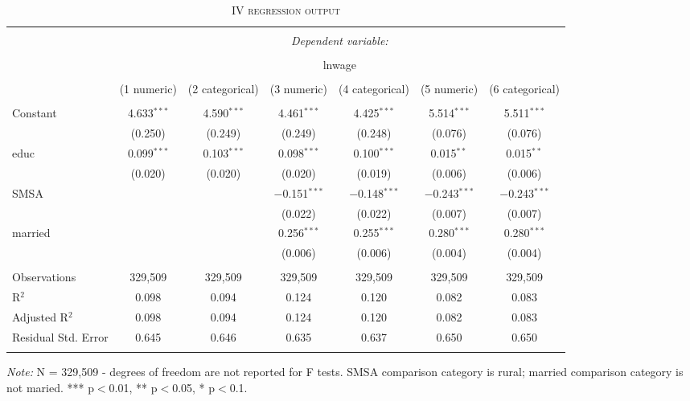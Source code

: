 \documentclass[a4paper]{article}
\begin{document}
\begin{table}[!htbp] \centering 
\begin{adjustwidth}{0.cm}{-0cm}
\begin{threeparttable}
\small
\captionsetup{font=small, justification=raggedright,singlelinecheck=false}
\caption{\textsc{IV regression output}}
\centering 
  \label{}
\small 
\begin{tabular}{@{\extracolsep{-3pt}}lcccccc} 
\\[-5.8ex]\hline 
\hline \\[-1.8ex] 
 & \multicolumn{6}{c}{\textit{Dependent variable:}} \\ 
\cline{2-7} 
\\[-1.8ex] & \multicolumn{6}{c}{lnwage} \\ 
\\[-1.8ex] & (1 numeric) & (2 categorical) & (3 numeric) & (4 categorical) & (5 numeric) & (6 categorical)\\ 
\hline \\[-1.8ex] 
 Constant & 4.633$^{***}$ & 4.590$^{***}$ & 4.461$^{***}$ & 4.425$^{***}$ & 5.514$^{***}$ & 5.511$^{***}$ \\ 
  & (0.250) & (0.249) & (0.249) & (0.248) & (0.076) & (0.076) \\ 
  educ & 0.099$^{***}$ & 0.103$^{***}$ & 0.098$^{***}$ & 0.100$^{***}$ & 0.015$^{**}$ & 0.015$^{**}$ \\ 
  & (0.020) & (0.020) & (0.020) & (0.019) & (0.006) & (0.006) \\ 
  SMSA &  &  & $-$0.151$^{***}$ & $-$0.148$^{***}$ & $-$0.243$^{***}$ & $-$0.243$^{***}$ \\ 
  &  &  & (0.022) & (0.022) & (0.007) & (0.007) \\ 
  married &  &  & 0.256$^{***}$ & 0.255$^{***}$ & 0.280$^{***}$ & 0.280$^{***}$ \\ 
  &  &  & (0.006) & (0.006) & (0.004) & (0.004) \\ 
 \hline \\[-1.8ex] 
Observations & 329,509 & 329,509 & 329,509 & 329,509 & 329,509 & 329,509 \\ 
R$^{2}$ & 0.098 & 0.094 & 0.124 & 0.120 & 0.082 & 0.083 \\ 
Adjusted R$^{2}$ & 0.098 & 0.094 & 0.124 & 0.120 & 0.082 & 0.083 \\ 
Residual Std. Error & 0.645  & 0.646  & 0.635  & 0.637 & 0.650 & 0.650  \\ 
\hline 
\hline \\[-3.5ex] 
\end{tabular} 
\begin{tablenotes}
      \small
      \item\textit{Note:} N = 329,509 - degrees of freedom are not reported for F tests. SMSA comparison category is rural; married comparison category is not maried. *** p$<$0.01, ** p$<$0.05, * p$<$0.1.
    \end{tablenotes}
\end{threeparttable}
\end{adjustwidth}
%
\end{table}
\end{document}

